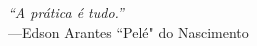 \chapter*{}
\vspace*{\fill}

\hfill
\textit{``A pr{\'a}tica {\'e} tudo.''} \\
\vspace{.2em}
\hfill
---Edson Arantes ``Pel{\'e}" do Nascimento
\vspace{1em}

\cleardoublepage
